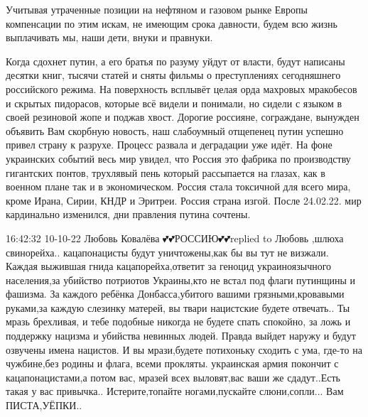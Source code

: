 Учитывая утраченные позиции на нефтяном и газовом рынке Европы компенсации по
этим искам, не имеющим срока давности, будем всю жизнь выплачивать мы, наши
дети, внуки и правнуки.

Когда сдохнет путин, а его братья по разуму уйдут от власти, будут написаны
десятки книг, тысячи статей и сняты фильмы о преступлениях сегодняшнего
российского режима. На поверхность всплывёт целая орда махровых мракобесов и
скрытых пидорасов, которые всё видели и понимали, но сидели с языком в своей
резиновой жопе и поджав хвост. Дорогие россияне, сограждане, вынужден объявить
Вам скорбную новость, наш слабоумный отщепенец путин успешно привел страну к
разрухе. Процесс развала и деградации уже идёт. На фоне украинских событий весь
мир увидел, что Россия это фабрика по производству гигантских понтов, трухлявый
пень который рассыпается на глазах, как в военном плане так и в экономическом.
Россия стала токсичной для всего мира, кроме Ирана, Сирии, КНДР и Эритреи.
Россия страна изгой. После 24.02.22. мир кардинально изменился, дни правления
путина сочтены.


16:42:32 10-10-22
Любовь Ковалёва 💕💕РОССИЮ💕💕replied to Любовь
,шлюха свинорейха..
кацапонацисты будут уничтожены,как бы вы тут не визжали.
Каждая выжившая гнида кацапорейха,ответит за геноцид украиноязычного населения,за убийство потриотов Украины,кто не встал под флаги путинщины и фашизма.
За каждого ребёнка Донбасса,убитого вашими грязными,кровавыми руками,за каждую слезинку матерей, вы твари нацистские будете отвечать..
Ты мразь брехливая, и тебе подобные никогда не будете спать спокойно, за ложь и поддержку нацизма и убийства невинных людей. Правда выйдет наружу и будут озвучены имена нацистов. И вы мрази,будете потихоньку сходить с ума, где-то на чужбине,без родины и флага, всеми прокляты. украинская армия покончит с кацапонацистами,а потом вас, мразей всех выловят,вас ваши же сдадут..Есть такая у вас привычка..
Истерите,топайте ногами,пускайте слюни,сопли...
Вам ПИСТА,УЁПКИ..

